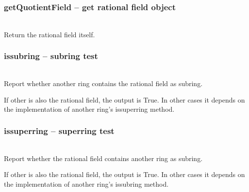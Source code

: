   \subsubsection{getQuotientField -- get rational field object}
   \\
   \spacing
   \quad Return the rational field itself.
%
  \subsubsection{issubring -- subring test}
   \\
   \spacing
   \quad Report whether another ring contains the rational field as subring.

   If other is also the rational field, the output is True. In other cases it depends on the implementation of another ring's issuperring method.
   \spacing
%
  \subsubsection{issuperring -- superring test}
   \\
   \spacing
   \quad Report whether the rational field contains another ring as subring.

If other is also the rational field, the output is True. In other cases it depends on the implementation of another ring's issubring method.
   \spacing
\C



